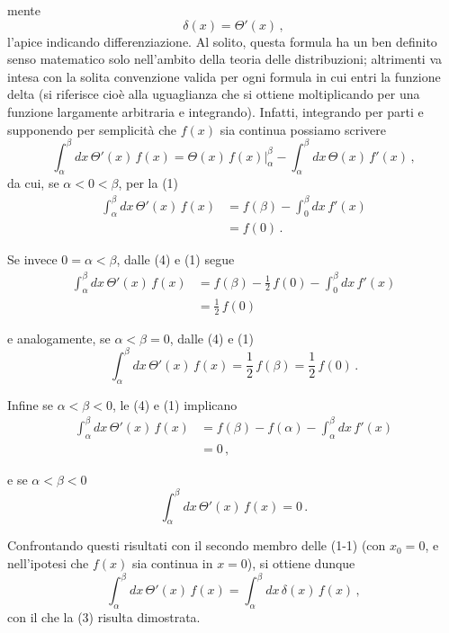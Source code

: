 \documentclass[11pt, a4paper]{book}
\numberwithin{equation}{section}
\begin{document}
\noindent mente
\begin{equation}
\delta(x) = \Theta'(x) \,, \tag{3}
\end{equation}
l'apice indicando differenziazione. Al solito, questa formula ha un ben definito senso matematico solo nell'ambito della teoria delle distribuzioni; altrimenti va intesa con la solita convenzione valida per ogni formula in cui entri la funzione delta (si riferisce cioè alla uguaglianza che si ottiene moltiplicando per una funzione largamente arbitraria e integrando). Infatti, integrando per parti e supponendo per semplicità che $f(x)$ sia continua possiamo scrivere
\begin{equation}
\int_{\alpha}^{\beta} dx\, \Theta'(x)\, f(x) = \Theta(x)\, f(x)\Big|_{\alpha}^{\beta} - \int_{\alpha}^{\beta} dx\, \Theta(x)\, f'(x) \,, \tag{4}
\end{equation}
da cui, se $\alpha < 0 < \beta$, per la (1)
\begin{align}
\int_{\alpha}^{\beta} dx\, \Theta'(x)\, f(x) &= f(\beta) - \int_{0}^{\beta} dx\, f'(x) \tag{5a} \\
&= f(0) \,. \tag{5b}
\end{align}

Se invece $0 = \alpha < \beta$, dalle (4) e (1) segue
\begin{align}
\int_{\alpha}^{\beta} dx\, \Theta'(x)\, f(x) &= f(\beta) - \frac{1}{2}\,f(0) - \int_{0}^{\beta} dx\, f'(x) \tag{6a} \\
&= \frac{1}{2}\,f(0) \tag{6b}
\end{align}

e analogamente, se $\alpha < \beta = 0$, dalle (4) e (1)
\begin{equation}
\int_{\alpha}^{\beta} dx\, \Theta'(x)\, f(x) = \frac{1}{2}\,f(\beta) = \frac{1}{2}\,f(0) \,. \tag{7}
\end{equation}

Infine se $\alpha < \beta < 0$, le (4) e (1) implicano
\begin{align}
\int_{\alpha}^{\beta} dx\, \Theta'(x)\, f(x) &= f(\beta) - f(\alpha) - \int_{\alpha}^{\beta} dx\, f'(x) \tag{8a} \\
&= 0 \,, \tag{8b}
\end{align}

e se $\alpha < \beta < 0$
\begin{equation}
\int_{\alpha}^{\beta} dx\, \Theta'(x)\, f(x) = 0 \,. \tag{9}
\end{equation}

Confrontando questi risultati con il secondo membro delle (1-1) (con $x_0 = 0$, e nell'ipotesi che $f(x)$ sia continua in $x=0$), si ottiene dunque
\begin{equation}
\int_{\alpha}^{\beta} dx\, \Theta'(x)\, f(x) = \int_{\alpha}^{\beta} dx\, \delta(x)\, f(x) \,, \tag{10}
\end{equation}
con il che la (3) risulta dimostrata.
\end{document}
